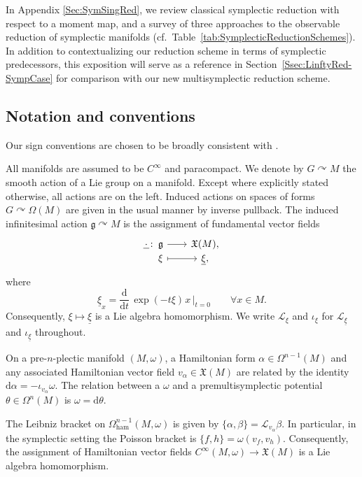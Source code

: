 \documentclass[10pt,a4paper]{amsart}
\numberwithin{equation}{section}
\DeclareMathOperator{\action}{\curvearrowright}
\newcommand{\g}{\mathfrak{g}}
\newcommand{\ham}{\text{ham}}
\renewcommand{\L}{\mathscr{L}}
\newcommand{\X}{\mathfrak{X}}
\renewcommand{\d}{\mathrm{d}}
\newcommand{\morphism}[5]{%
  \begin{tikzcd}[
    column sep=2em,
    row sep=-.5ex,
    ampersand replacement=\&
  ]
  #1\colon~ \&[-3em]
  #2\vphantom{#3} \arrow[r] \&
  #3\vphantom{#2} \\
  \&
  #4\vphantom{#5} \arrow[r,mapsto] \&
  #5\vphantom{#4}
  \end{tikzcd}%
}
\begin{document}
In Appendix \ref{Sec:SymSingRed}, we review classical symplectic reduction with respect to a moment map, and a survey of three approaches to the observable reduction of symplectic manifolds (cf.\ Table~\ref{tab:SymplecticReductionSchemes}). In addition to contextualizing our reduction scheme in terms of symplectic predecessors, this exposition will serve as a reference in Section~\ref{Ssec:LinftyRed-SympCase} for comparison with our new multisymplectic reduction scheme.



\setcounter{section}{1}
\setcounter{Theorem}{0}


\subsection*{Notation and conventions}

Our sign conventions are chosen to be broadly consistent with \cite{CalliesFregierRogersZambon16}.

All manifolds are assumed to be $C^\infty$ and paracompact.
We denote by $G\action M$ the smooth action of a Lie group on a manifold.
Except where explicitly stated otherwise, all actions are on the left.
Induced actions on spaces of forms $G\curvearrowright\Omega(M)$ are given in the usual manner by inverse pullback.
The induced infinitesimal action $\g\curvearrowright M$ is the assignment of fundamental vector fields
\[
	\morphism{\underline{\,\cdot\,}}
	{\mathfrak{g}}
	{\mathfrak{X}(M),}
	{\xi}
	{\underline\xi,}
\]
where
\[
	\underline\xi_x = \dfrac{\d}{\d t}\,\exp{(-t \xi)}\hspace{1pt}x \,\Big|_{t=0}
	\qquad \forall x \in M.
\]
Consequently, $\xi\mapsto\underline\xi$ is a Lie algebra homomorphism. We write $\L_\xi$ and $\iota_\xi$ for $\L_{\underline\xi}$ and $\iota_{\underline\xi}$ throughout.

On a pre-$n$-plectic manifold $(M,\omega)$, a Hamiltonian form $\alpha\in\Omega^{n-1}(M)$ and any associated Hamiltonian vector field $v_\alpha \in\X(M)$ are related by the identity $\d\alpha=-\iota_{v_\alpha}\omega$.
The relation between a $\omega$ and a premultisymplectic potential $\theta\in\Omega^n(M)$ is $\omega=\d\theta$.

The Leibniz bracket on $\Omega_\ham^{n-1}(M,\omega)$ is given by $\{\alpha,\beta\}= \L_{v_\alpha}\beta$.
In particular, in the symplectic setting the Poisson bracket is $\{f,h\}=\omega(v_f,v_h)$.
Consequently, the assignment of Hamiltonian vector fields $C^{\infty}(M,\omega)\to \mathfrak X(M)$ is a Lie algebra homomorphism.
\end{document}
